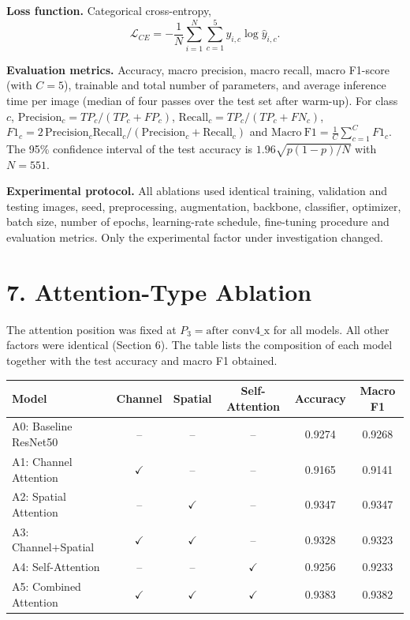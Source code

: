 \documentclass[10pt]{article}
\begin{document}
\textbf{Loss function.} Categorical cross-entropy,
\[
\mathcal{L}_{CE}
=
-
\frac{1}{N}
\sum_{i=1}^{N}
\sum_{c=1}^{5}
y_{i,c}
\log
\widehat{y}_{i,c}.
\]

\textbf{Evaluation metrics.} Accuracy, macro precision, macro recall, macro
F1-score (with $C=5$), trainable and total number of parameters, and average
inference time per image (median of four passes over the test set after
warm-up). For class $c$, $\mathrm{Precision}_c=TP_c/(TP_c+FP_c)$,
$\mathrm{Recall}_c=TP_c/(TP_c+FN_c)$,
$F1_c=2\,\mathrm{Precision}_c\mathrm{Recall}_c/(\mathrm{Precision}_c+\mathrm{Recall}_c)$
and $\mathrm{Macro\ F1}=\frac{1}{C}\sum_{c=1}^{C}F1_c$. The 95\% confidence
interval of the test accuracy is $1.96\sqrt{p(1-p)/N}$ with $N=551$.

\textbf{Experimental protocol.} All ablations used identical training,
validation and testing images, seed, preprocessing, augmentation, backbone,
classifier, optimizer, batch size, number of epochs, learning-rate schedule,
fine-tuning procedure and evaluation metrics. Only the experimental factor
under investigation changed.

\section*{7. Attention-Type Ablation}

The attention position was fixed at
$P_3=\text{after conv4\_x}$ for all models. All other factors were identical
(Section 6). The table lists the composition of each model together with the
test accuracy and macro F1 obtained.

\begin{center}

\begin{tabular}{|l|c|c|c|c|c|}
\hline

\textbf{Model}
&
\textbf{Channel}
&
\textbf{Spatial}
&
\textbf{Self-Attention}
&
\textbf{Accuracy}
&
\textbf{Macro F1}
\\
\hline

A0: Baseline ResNet50
&
--
&
--
&
--
&
0.9274
&
0.9268
\\
\hline

A1: Channel Attention
&
$\checkmark$
&
--
&
--
&
0.9165
&
0.9141
\\
\hline

A2: Spatial Attention
&
--
&
$\checkmark$
&
--
&
0.9347
&
0.9347
\\
\hline

A3: Channel+Spatial
&
$\checkmark$
&
$\checkmark$
&
--
&
0.9328
&
0.9323
\\
\hline

A4: Self-Attention
&
--
&
--
&
$\checkmark$
&
0.9256
&
0.9233
\\
\hline

A5: Combined Attention
&
$\checkmark$
&
$\checkmark$
&
$\checkmark$
&
0.9383
&
0.9382
\\
\hline

\end{tabular}

\end{center}
\end{document}

